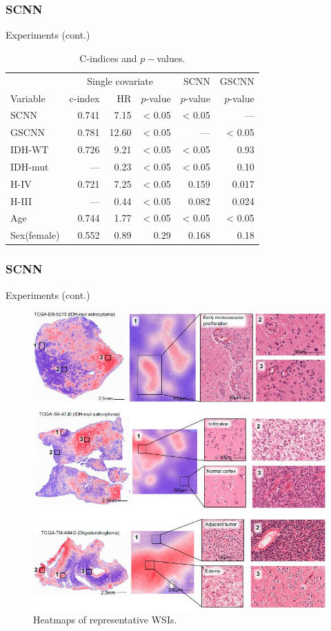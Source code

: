 \documentclass{beamer}
\begin{document}
	\begin{frame}
		\frametitle{SCNN}
		Experiments (cont.)
		
		\begin{table}[H]
			\begin{center}
				\begin{tabular}{ l r r r r r }
					& \multicolumn{3}{c}{Single covariate} & SCNN & GSCNN \\
					\cline{2 - 6}
					Variable & c-index & HR & $p$-value & $p$-value & $p$-value \\
					\hline
					SCNN & 0.741 & 7.15 & < 0.05 & < 0.05 & —\\
					GSCNN & 0.781 &	12.60 & < 0.05 & — & < 0.05\\
					IDH-WT & 0.726 & 9.21 & < 0.05 & < 0.05 & 0.93 \\
					IDH-mut & — & 0.23 & < 0.05 & < 0.05 & 0.10 \\
					H-IV & 0.721 & 7.25 & < 0.05 & 0.159 & 0.017 \\
					H-III & — & 0.44 & < 0.05 & 0.082 & 0.024 \\
					Age & 0.744 & 1.77 & < 0.05 & < 0.05 & < 0.05 \\
					Sex(female) & 0.552 & 0.89 & 0.29 & 0.168 & 0.18\\
					\hline
				\end{tabular}
			\end{center}
			\caption{C-indices and $p-$values.}
		\end{table} 
	\end{frame}
	
	\begin{frame}
		\frametitle{SCNN}
		Experiments (cont.)
		
		\begin{figure}[H]
			\centering
			\includegraphics[scale=0.35]{figures/heatmap.jpg}
			\caption{Heatmaps of representative WSIs.}
			\label{fig:km-curve}
		\end{figure}
	\end{frame}
\end{document}
